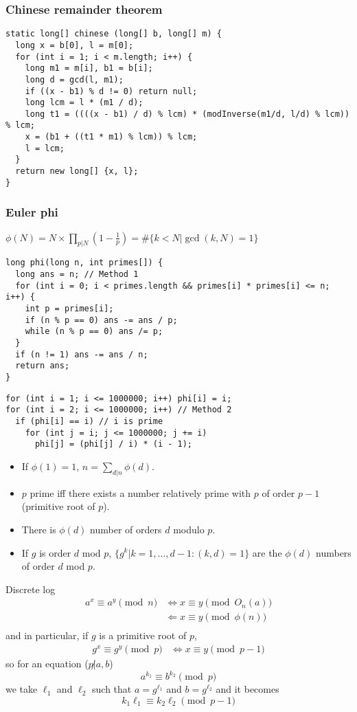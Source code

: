 \subsubsection{Chinese remainder theorem}
\begin{lstlisting}
static long[] chinese (long[] b, long[] m) {
  long x = b[0], l = m[0];
  for (int i = 1; i < m.length; i++) {
    long m1 = m[i], b1 = b[i];
    long d = gcd(l, m1);
    if ((x - b1) % d != 0) return null;
    long lcm = l * (m1 / d);
    long t1 = ((((x - b1) / d) % lcm) * (modInverse(m1/d, l/d) % lcm)) % lcm;
    x = (b1 + ((t1 * m1) % lcm)) % lcm;
    l = lcm;
  }
  return new long[] {x, l};
}
\end{lstlisting}

\subsubsection{Euler phi}
$\phi(N) = N \times \prod_{p | N} (1 - \frac{1}{p}) = \#\{k < N | \gcd(k,N) = 1\}$
\begin{lstlisting}
long phi(long n, int primes[]) {
  long ans = n; // Method 1
  for (int i = 0; i < primes.length && primes[i] * primes[i] <= n; i++) {
    int p = primes[i];
    if (n % p == 0) ans -= ans / p;
    while (n % p == 0) ans /= p;
  }
  if (n != 1) ans -= ans / n;
  return ans;
}
\end{lstlisting}
\begin{lstlisting}
for (int i = 1; i <= 1000000; i++) phi[i] = i;
for (int i = 2; i <= 1000000; i++) // Method 2
  if (phi[i] == i) // i is prime
    for (int j = i; j <= 1000000; j += i)
      phi[j] = (phi[j] / i) * (i - 1);
\end{lstlisting}

\begin{itemize}
  \item If $\phi(1) = 1$, $n = \sum_{d|n} \phi(d)$.
  \item $p$ prime iff there exists a number relatively prime with $p$ of order $p-1$ (primitive root of $p$).
  \item There is $\phi(d)$ number of orders $d$ modulo $p$.
  \item If $g$ is order $d$ mod $p$, $\{g^k | k=1,\ldots,d-1 : (k,d) = 1\}$ are the
    $\phi(d)$ numbers of order $d$ mod $p$.
\end{itemize}

Discrete log
\begin{align*}
  a^x \equiv a^y \pmod{n} & \Leftrightarrow x \equiv y \pmod{O_n(a)}\\
                          & \Leftarrow x \equiv y \pmod{\phi(n)}\\
\end{align*}
and in particular, if $g$ is a primitive root of $p$,
\begin{align*}
  g^x \equiv g^y \pmod{p} & \Leftrightarrow x \equiv y \pmod{p-1}
\end{align*}
so for an equation ($p \not| a,b$)
\[ a^{k_1} \equiv b^{k_2} \pmod{p} \]
we take $\ell_1$ and $\ell_2$ such that $a = g^{\ell_1}$ and $b = g^{\ell_2}$
and it becomes
\[ k_1\ell_1 \equiv k_2\ell_2 \pmod{p-1} \]


